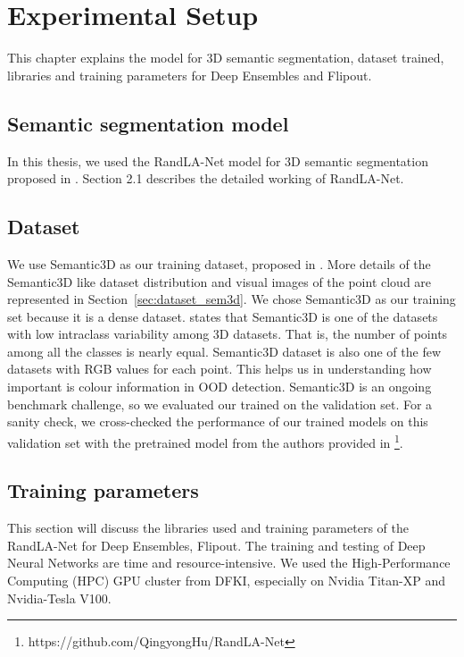 

    \chapter{Experimental Setup}
    This chapter explains the model for 3D semantic segmentation, dataset trained, libraries and training parameters for Deep Ensembles and Flipout.

    \section{Semantic segmentation model}
    In this thesis, we used the RandLA-Net model for 3D semantic segmentation proposed in \cite{Hu_2020_CVPR_Randla}.
    Section 2.1 describes the detailed working of RandLA-Net. 

    \section{Dataset}
    We use Semantic3D as our training dataset, proposed in \cite{hackel2017semantic3d}.
    More details of the Semantic3D like dataset distribution and visual images of the point cloud are represented in Section~\ref{sec:dataset_sem3d}.
    We chose Semantic3D as our training set because it is a dense dataset.
    \cite{survey3d} states that Semantic3D is one of the datasets with low intraclass variability among 3D datasets.
    That is, the number of points among all the classes is nearly equal.
    Semantic3D dataset is also one of the few datasets with RGB values for each point.
    This helps us in understanding how important is colour information in OOD detection.
    Semantic3D is an ongoing benchmark challenge, so we evaluated our trained on the validation set.
    For a sanity check, we cross-checked the performance of our trained models on this validation set with the pretrained model from the authors provided in \footnote[1]{https://github.com/QingyongHu/RandLA-Net}.

    \section{Training parameters}
    This section will discuss the libraries used and training parameters of the RandLA-Net for Deep Ensembles, Flipout.
    The training and testing of Deep Neural Networks are time and resource-intensive.
    We used the High-Performance Computing (HPC) GPU cluster from DFKI, especially on Nvidia Titan-XP and Nvidia-Tesla V100.
